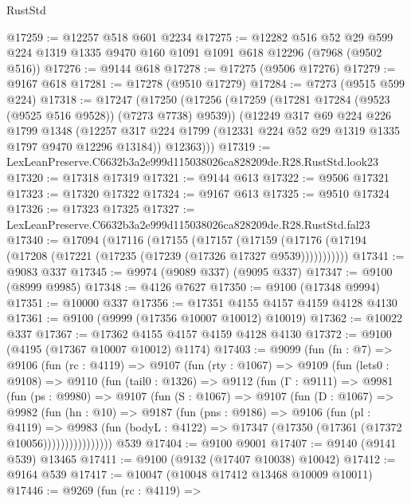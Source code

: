\begin{lexlean}{RustStd}
\begin{coremodule}
@17259 := @12257 @518 @601 @2234
@17275 := @12282
    @516
    @52
    @29
    @599
    @224
    @1319
    @1335
    @9470
    @160
    @1091
    @1091
    @618
    @12296
    (@7968 (@9502 @516))
@17276 := @9144 @618
@17278 := @17275 (@9506 @17276)
@17279 := @9167 @618
@17281 := @17278 (@9510 @17279)
@17284 := @7273 (@9515 @599 @224)
@17318 := @17247
    (@17250
      (@17256
        (@17259 (@17281 @17284 (@9523 (@9525 @516 @9528)) (@7273 @7738) @9539))
        (@12249
          @317
          @69
          @224
          @226
          @1799
          @1348
          (@12257 @317 @224 @1799 (@12331 @224 @52 @29 @1319 @1335 @1797 @9470 @12296 @13184))
          @12363)))
@17319 := LexLeanPreserve.C6632b3a2e999d115038026ca828209de.R28.RustStd.look23
@17320 := @17318 @17319
@17321 := @9144 @613
@17322 := @9506 @17321
@17323 := @17320 @17322
@17324 := @9167 @613
@17325 := @9510 @17324
@17326 := @17323 @17325
@17327 := LexLeanPreserve.C6632b3a2e999d115038026ca828209de.R28.RustStd.fal23
@17340 := @17094
    (@17116
      (@17155
        (@17157
          (@17159 (@17176 (@17194 (@17208 (@17221 (@17235 (@17239 (@17326 @17327 @9539)))))))))))
@17341 := @9083 @337
@17345 := @9974 (@9089 @337) (@9095 @337)
@17347 := @9100 (@8999 @9985)
@17348 := @4126 @7627
@17350 := @9100 (@17348 @9994)
@17351 := @10000 @337
@17356 := @17351 @4155 @4157 @4159 @4128 @4130
@17361 := @9100 (@9999 (@17356 @10007 @10012) @10019)
@17362 := @10022 @337
@17367 := @17362 @4155 @4157 @4159 @4128 @4130
@17372 := @9100 (@4195 (@17367 @10007 @10012) @1174)
@17403 := @9099
    (fun (fn : @7) =>
    @9106
      (fun (rc : @4119) =>
      @9107
        (fun (rty : @1067) =>
        @9109
          (fun (lets0 : @9108) =>
          @9110
            (fun (tail0 : @1326) =>
            @9112
              (fun (Γ : @9111) =>
              @9981
                (fun (ps : @9980) =>
                @9107
                  (fun (S : @1067) =>
                  @9107
                    (fun (D : @1067) =>
                    @9982
                      (fun (hn : @10) =>
                      @9187
                        (fun (pns : @9186) =>
                        @9106
                          (fun (pl : @4119) =>
                          @9983
                            (fun (bodyL : @4122) =>
                            @17347 (@17350 (@17361 (@17372 @10056))))))))))))))))
    @539
@17404 := @9100 @9001
@17407 := @9140 (@9141 @539) @13465
@17411 := @9100 (@9132 (@17407 @10038) @10042)
@17412 := @9164 @539
@17417 := @10047 (@10048 @17412 @13468 @10009 @10011)
@17446 := @9269
    (fun (rc : @4119) =>

\end{coremodule}
\end{lexlean}
